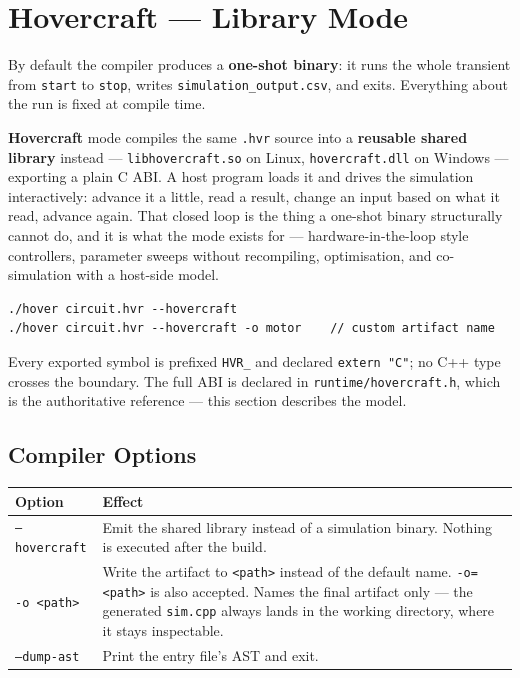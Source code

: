 \documentclass[11pt, a4paper]{article}
\newcommand{\code}[1]{\texttt{\small #1}}
\begin{document}
\section{Hovercraft --- Library Mode}
\label{sec:hovercraft}

By default the compiler produces a \textbf{one-shot binary}: it runs the whole
transient from \code{start} to \code{stop}, writes
\code{simulation\_output.csv}, and exits. Everything about the run is fixed at
compile time.

\textbf{Hovercraft} mode compiles the same \code{.hvr} source into a
\textbf{reusable shared library} instead --- \code{libhovercraft.so} on Linux,
\code{hovercraft.dll} on Windows --- exporting a plain C ABI. A host program
loads it and drives the simulation interactively: advance it a little, read a
result, change an input based on what it read, advance again. That closed loop
is the thing a one-shot binary structurally cannot do, and it is what the mode
exists for --- hardware-in-the-loop style controllers, parameter sweeps without
recompiling, optimisation, and co-simulation with a host-side model.

\begin{lstlisting}
./hover circuit.hvr --hovercraft
./hover circuit.hvr --hovercraft -o motor    // custom artifact name
\end{lstlisting}

Every exported symbol is prefixed \code{HVR\_} and declared \code{extern "C"};
no C++ type crosses the boundary. The full ABI is declared in
\code{runtime/hovercraft.h}, which is the authoritative reference --- this
section describes the model.

\subsection{Compiler Options}

\begin{center}
\begin{tabular}{@{} L{3.4cm} L{9.6cm} @{}}
  \toprule
  \textbf{Option} & \textbf{Effect} \\
  \midrule
  \code{--hovercraft} & Emit the shared library instead of a simulation binary.
    Nothing is executed after the build. \\
  \code{-o <path>}    & Write the artifact to \code{<path>} instead of the
    default name. \code{-o=<path>} is also accepted. Names the final artifact
    only --- the generated \code{sim.cpp} always lands in the working
    directory, where it stays inspectable. \\
  \code{--dump-ast}   & Print the entry file's AST and exit. \\
  \bottomrule
\end{tabular}
\end{center}
\end{document}
